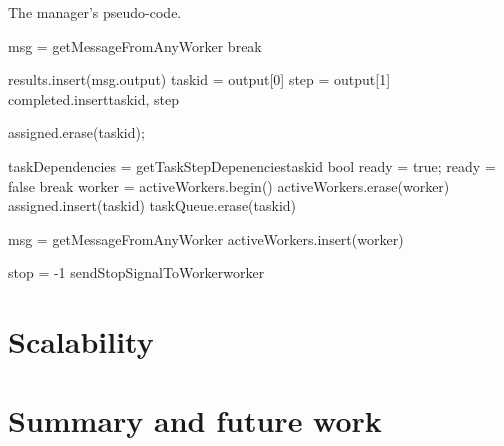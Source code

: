 \documentclass[a4paper,oneside,12pt]{article}
\begin{document}
\begin{algorithm}
\caption{The manager's pseudo-code.}
    \begin{algorithmic}[1] %



            \State msg = getMessageFromAnyWorker{}
              \State break
            \EndIf

            \State results.insert(msg.output)
            \State taskid = output[0]
            \State step = output[1]
            completed.insert{taskid, step}

                assigned.erase(taskid);
            \EndIf
        \EndWhile

            \State taskDependencies = getTaskStepDepenencies{taskid}
            bool ready = true;
                    \State ready = false
                    \State break
                \EndIf
            \EndFor
                \State worker = activeWorkers.begin()
                \State activeWorkers.erase(worker)
                \State {}
                \State assigned.insert(taskid)
                \State taskQueue.erase(taskid)
            \EndIf
        \EndFor

            \State msg = getMessageFromAnyWorker{}
                \State activeWorkers.insert(worker)
            \EndIf
        \EndFor

    \EndWhile

    \State stop = -1
        \Call sendStopSignalToWorker{worker}
    \EndFor

\end{algorithmic}
\label{algo:manager}
\end{algorithm}

\section{Scalability}


\section{Summary and future work}
   
\end{document}
